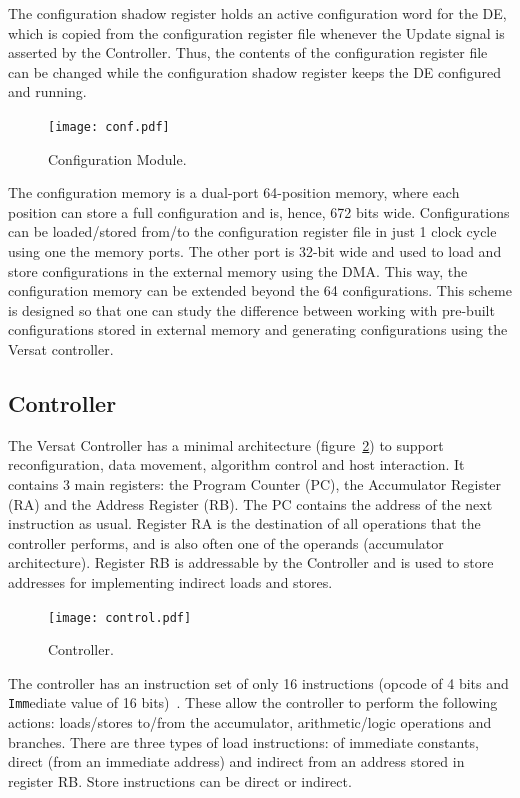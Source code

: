 \documentclass[journal]{IEEEtran}
\begin{document}
The configuration shadow register holds an active configuration word
for the DE, which is copied from the configuration register file
whenever the Update signal is asserted by the Controller. Thus, the
contents of the configuration register file can be changed while the
configuration shadow register keeps the DE configured and running.

\begin{figure}[!h]
\centering \texttt{[image: conf.pdf]}
\caption{Configuration Module.}
\label{fig_conf}
\end{figure}

The configuration memory is a dual-port 64-position memory, where each
position can store a full configuration and is, hence, 672 bits
wide. Configurations can be loaded/stored from/to the configuration
register file in just 1 clock cycle using one the memory ports. The
other port is 32-bit wide and used to load and store configurations in
the external memory using the DMA. This way, the configuration memory
can be extended beyond the 64 configurations. This scheme is designed
so that one can study the difference between working with pre-built
configurations stored in external memory and generating configurations
using the Versat controller.

\subsection{Controller}
\label{section:controller}

The Versat Controller has a minimal architecture
(figure~\ref{fig_control}) to support reconfiguration, data movement,
algorithm control and host interaction. It contains 3 main registers:
the Program Counter (PC), the Accumulator Register (RA) and the
Address Register (RB). The PC contains the address of the next
instruction as usual. Register RA is the destination of all operations
that the controller performs, and is also often one of the operands
(accumulator architecture). Register RB is addressable by the
Controller and is used to store addresses for implementing indirect
loads and stores.

\begin{figure}[!h]
\centering \texttt{[image: control.pdf]}
\caption{Controller.}
\label{fig_control}
\end{figure}

The controller has an instruction set of only 16 instructions (opcode
of 4 bits and {\tt Imm}ediate value of 16
bits)~\cite{Lopes2017}. These allow the controller to perform the
following actions: loads/stores to/from the accumulator,
arithmetic/logic operations and branches. There are three types of
load instructions: of immediate constants, direct (from an immediate
address) and indirect from an address stored in register RB. Store
instructions can be direct or indirect.
\end{document}
